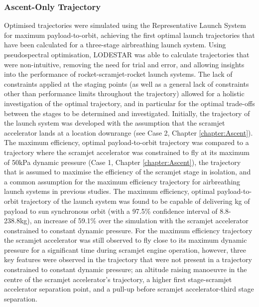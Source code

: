 \subsubsection{Ascent-Only Trajectory}
Optimised trajectories were simulated using the Representative Launch System for maximum payload-to-orbit, achieving the first optimal launch trajectories that have been calculated for a three-stage airbreathing launch system. Using pseudospectral optimisation, LODESTAR was able to calculate trajectories that were non-intuitive, removing the need for trial and error, and allowing insights into the performance of rocket-scramjet-rocket launch systems. The lack of constraints applied at the staging points (as well as a general lack of constraints other than performance limits throughout the trajectory) allowed for a holistic investigation of the optimal trajectory, and in particular for the optimal trade-offs between the stages to be determined and investigated.
Initially, the trajectory of the launch system was developed with the assumption that the scramjet accelerator lands at a location downrange (see Case 2, Chapter \ref{chapter:Ascent}).
The maximum efficiency, optimal payload-to-orbit trajectory was compared to a trajectory where the scramjet accelerator was constrained to fly at its maximum of 50kPa dynamic pressure (Case 1, Chapter \ref{chapter:Ascent}), the trajectory that is assumed to maximise the efficiency of the scramjet stage in isolation, and a common assumption for the maximum efficiency trajectory for airbreathing launch systems in previous studies. 
The maximum efficiency, optimal payload-to-orbit trajectory of the launch system was found to be capable of delivering \PayloadToOrbitStandardNoReturn kg of payload to sun synchronous orbit (with a 97.5\% confidence interval of 8.8-238.8kg), an increase of 59.1\% over the simulation with the scramjet accelerator constrained to constant dynamic pressure. For the maximum efficiency trajectory the scramjet accelerator was still observed to fly close to its maximum dynamic pressure for a significant time during scramjet engine operation, however, three key features were observed in the trajectory that were not present in a trajectory constrained to constant dynamic pressure; an altitude raising manoeuvre in the centre of the scramjet accelerator's trajectory, a higher first stage-scramjet accelerator separation point, and a pull-up before scramjet accelerator-third stage separation.



